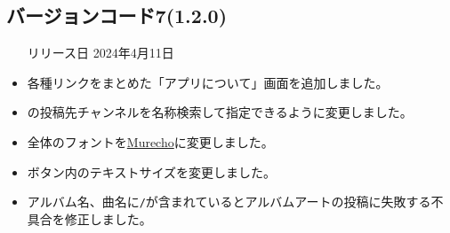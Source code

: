 \subsection*{バージョンコード7(1.2.0)}
\begin{itemize}
    \item[リリース日] 2024年4月11日
\end{itemize}

\new
\begin{itemize}
    \item 各種リンクをまとめた「アプリについて」画面を追加しました。
\end{itemize}

\change
\begin{itemize}
    \item \nowplaying の投稿先チャンネルを名称検索して指定できるように変更しました。
    \item \bj 全体のフォントを\href{https://fonts.google.com/specimen/Murecho?subset=japanese}{Murecho}に変更しました。
    \item ボタン内のテキストサイズを変更しました。
\end{itemize}

\fix
\begin{itemize}
    \item アルバム名、曲名に\texttt{/}が含まれているとアルバムアートの投稿に失敗する不具合を修正しました。
\end{itemize}
